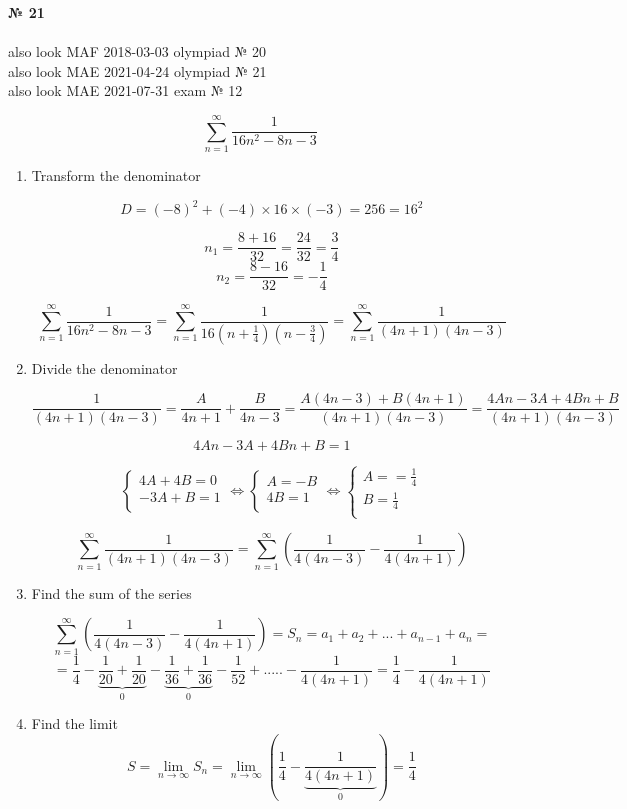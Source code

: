 \documentclass{article}
\begin{document}
\textbf{№ 21} 
\\
\\ also look MAF 2018-03-03 olympiad № 20
\\ also look MAE 2021-04-24 olympiad № 21
\\ also look MAE 2021-07-31 exam № 12

$$ \sum_{n=1}^{\infty} \frac{1}{16n^2-8n-3} $$

\begin{enumerate}

\item Transform the denominator

$$ D = (-8)^2 + (-4)\times16\times(-3)=256=16^2 $$

$$ n_1 = \frac{8+16}{32}=\frac{24}{32} = \frac{3}{4} $$
$$ n_2 = \frac{8-16}{32}=-\frac{1}{4} $$

$$\sum_{n=1}^{\infty} \frac{1}{16n^2-8n-3} 
= \sum_{n=1}^{\infty} \frac{1}{16(n+\frac{1}{4})(n-\frac{3}{4})} 
= \sum_{n=1}^{\infty} \frac{1}{(4n+1)(4n-3)}$$

\item Divide the denominator

$$\frac{1}{(4n+1)(4n-3)} 
= \frac{A}{4n+1} + \frac{B}{4n-3} 
= \frac{A(4n-3)+B(4n+1)}{(4n+1)(4n-3)} 
= \frac{4An-3A+4Bn+B}{(4n+1)(4n-3)}$$

$$4An-3A+4Bn+B = 1$$

$$
\left\{
  \begin{array}{ccc}
    4A + 4B = 0 \\
    -3A+B = 1 \\
  \end{array}\Leftrightarrow
\right.
\left\{
  \begin{array}{ccc}
    A = -B \\
    4B = 1 \\
  \end{array}\Leftrightarrow
\right.
\left\{
  \begin{array}{ccc}
    A = =\frac{1}{4} \\
    B = \frac{1}{4} \\
  \end{array}
\right.
$$

$$ \sum_{n=1}^{\infty} \frac{1}{(4n+1)(4n-3)} = 
\sum_{n=1}^{\infty} \left(\frac{1}{4(4n-3)} - \frac{1}{4(4n+1)}\right) $$

\item Find the sum of the series

$$ \sum_{n=1}^{\infty} \left(\frac{1}{4(4n-3)} - \frac{1}{4(4n+1)}\right) 
= S_n = a_1+a_2+...+a_{n-1}+a_n = $$
$$ = \frac{1}{4} - \underbrace{\frac{1}{20} + \frac{1}{20}}_{0} - \underbrace{\frac{1}{36} + \frac{1}{36}}_{0} - \frac{1}{52} + ..... - \frac{1}{4(4n+1)} = \frac{1}{4} - \frac{1}{4(4n+1)}$$

\item Find the limit
$$S = \lim_{n\to\infty} S_n 
= \lim_{n\to\infty} \left(\frac{1}{4} - \underbrace{\frac{1}{4(4n+1)}}_{0}\right) 
= \frac{1}{4} $$


\end{enumerate}
\end{document}
